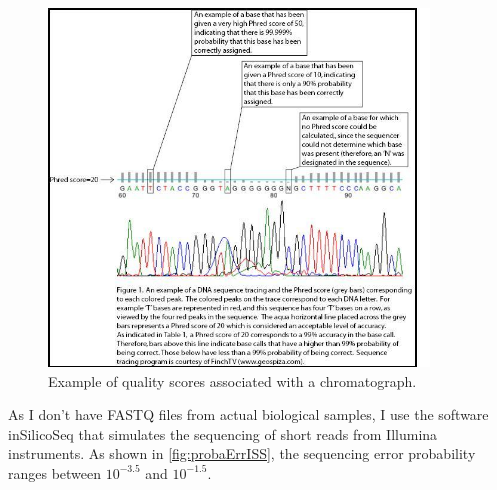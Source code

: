 \documentclass[12pt]{article}
\begin{document}
\begin{figure}[ht]
\begin{center}
 \includegraphics[width = 0.9\textwidth]{figs/Phred.jpg}
\caption{Example of quality scores associated with a chromatograph.}
\label{fig:phred}
\end{center}
\end{figure}

As I don't have FASTQ files from actual biological samples, I use the software  \textsf{inSilicoSeq} that simulates the sequencing of short reads from Illumina instruments. 
As shown in \autoref{fig:probaErrISS}, the sequencing error probability ranges between $10^{-3.5}$ and  $10^{-1.5}$.  
\end{document}
